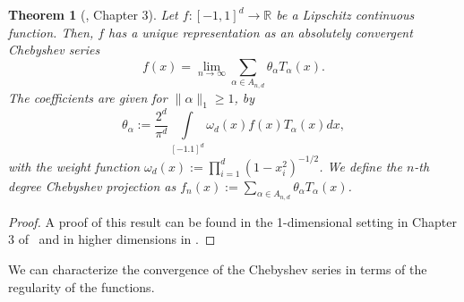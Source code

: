 \documentclass[pdflatex]{sn-jnl}%
\newtheorem{theorem}{Theorem}[section]%
\begin{document}
\begin{theorem}[\cite{Trefethen2019}, Chapter 3]\label{thm:cheb_exp}
    Let $f:[-1,1]^{d}\rightarrow \mathbb{R}$ be a Lipschitz continuous function. Then, $f$ has a unique representation as an absolutely convergent Chebyshev series
    \begin{equation}
        f(x) = \lim\limits_{n\rightarrow \infty}\sum\limits_{\alpha\in A_{n,d}}\theta_\alpha T_\alpha(x).
    \end{equation}
    The coefficients are given for $\|\alpha\|_1\geq 1$, by
    \begin{equation}
        \theta_\alpha := \frac{2^{d}}{\pi^{d}}\int\limits_{[-1.1]^{d}}\omega_d(x)f(x)T_\alpha(x) dx,
    \end{equation}
    with the weight function $\omega_d(x):= \prod\limits_{i=1}^{d} (1-x_i^2)^{-1/2}$. We define the $n$-th degree \emph{Chebyshev projection} as $f_n(x):= \sum\limits_{\alpha \in A_{n,d}}\theta_\alpha T_\alpha(x)$.
\end{theorem}
\vspace{-1em}\begin{proof}
    A proof of this result can be found in the 1-dimensional setting in Chapter 3 of~\cite{Trefethen2019} and in higher dimensions in \cite{MASON1980349}.
\end{proof}
We can characterize the convergence of the Chebyshev series in terms of the regularity of the functions.
\end{document}
